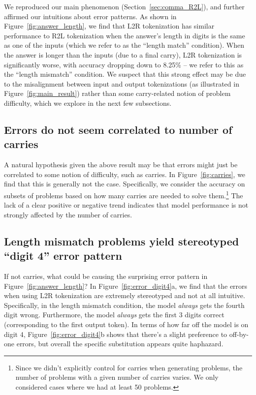 \documentclass{article}
\theoremstyle{plain}
\theoremstyle{definition}
\theoremstyle{remark}
\begin{document}
We reproduced our main phenomenon (Section~\ref{sec:comma_R2L}), and further affirmed our intuitions about error patterns. As shown in Figure~\ref{fig:answer_length}, we find that L2R tokenization has similar performance to R2L tokenization when the answer's length in digits is the same as one of the inputs (which we refer to as the ``length match'' condition). When the answer is longer than the inputs (due to a final carry), L2R tokenization is significantly worse, with accuracy dropping down to 8.25\% -- we refer to this as the ``length mismatch'' condition. We suspect that this strong effect may be due to the misalignment between input and output tokenizations (as illustrated in Figure~\ref{fig:main_result}) rather than some carry-related notion of problem difficulty, which we explore in the next few subsections.

\subsection{Errors do not seem correlated to number of carries}

A natural hypothesis given the above result may be that errors might just be correlated to some notion of difficulty, such as carries. In Figure~\ref{fig:carries}, we find that this is generally not the case. Specifically, we consider the accuracy on subsets of problems based on how many carries are needed to solve them.\footnote{Since we didn't explicitly control for carries when generating problems, the number of problems with a given number of carries varies. We only considered cases where we had at least 50 problems.} The lack of a clear positive or negative trend indicates that model performance is not strongly affected by the number of carries.

\subsection{Length mismatch problems yield stereotyped ``digit 4'' error pattern}
\label{sec:error_digit4}

If not carries, what could be causing the surprising error pattern in Figure~\ref{fig:answer_length}? In Figure~\ref{fig:error_digit4}a, we find that the errors when using L2R tokenization are extremely stereotyped and not at all intuitive. Specifically, in the length mismatch condition, the model \textit{always} gets the fourth digit wrong. Furthermore, the model \textit{always} gets the first 3 digits correct (corresponding to the first output token). In terms of how far off the model is on digit 4, Figure~\ref{fig:error_digit4}b shows that there's a slight preference to off-by-one errors, but overall the specific substitution appears quite haphazard. 
\end{document}
